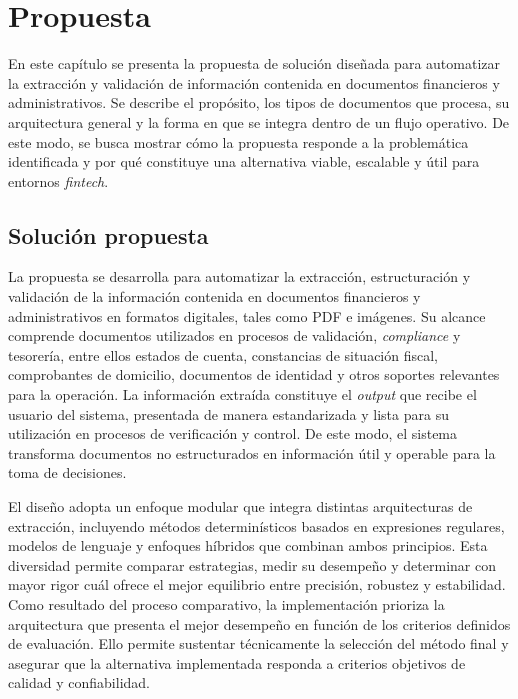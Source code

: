 \chapter{Propuesta}


En este capítulo se presenta la propuesta de solución diseñada para automatizar la extracción y validación de información contenida en documentos financieros y administrativos. Se describe el propósito, los tipos de documentos que procesa, su arquitectura general y la forma en que se integra dentro de un flujo operativo. De este modo, se busca mostrar cómo la propuesta responde a la problemática identificada y por qué constituye una alternativa viable, escalable y útil para entornos \textit{fintech}.


\section{Solución propuesta}
La propuesta se desarrolla para automatizar la extracción, estructuración y validación de la información contenida en documentos financieros y administrativos en formatos digitales, tales como PDF e imágenes. Su alcance comprende documentos utilizados en procesos de validación, \textit{compliance} y tesorería, entre ellos estados de cuenta, constancias de situación fiscal, comprobantes de domicilio, documentos de identidad y otros soportes relevantes para la operación. La información extraída constituye el \textit{output} que recibe el usuario del sistema, presentada de manera estandarizada y lista para su utilización en procesos de verificación y control. De este modo, el sistema transforma documentos no estructurados en información útil y operable para la toma de decisiones.

El diseño adopta un enfoque modular que integra distintas arquitecturas de extracción, incluyendo métodos determinísticos basados en expresiones regulares, modelos de lenguaje y enfoques híbridos que combinan ambos principios. Esta diversidad permite comparar estrategias, medir su desempeño y determinar con mayor rigor cuál ofrece el mejor equilibrio entre precisión, robustez y estabilidad. Como resultado del proceso comparativo, la implementación prioriza la arquitectura que presenta el mejor desempeño en función de los criterios definidos de evaluación. Ello permite sustentar técnicamente la selección del método final y asegurar que la alternativa implementada responda a criterios objetivos de calidad y confiabilidad.


